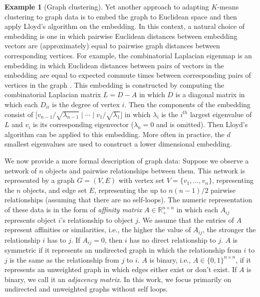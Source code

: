 \documentclass[
  12pt,
]{article}
\theoremstyle{definition}
\theoremstyle{definition}
\newtheorem{example}{Example}[section]
\theoremstyle{definition}
\theoremstyle{definition}
\theoremstyle{remark}
\begin{document}
\begin{example}[Graph clustering]
Yet another approach to adapting $K$-means clustering to graph data is to embed the graph to Euclidean space and then apply Lloyd's algorithm on the embedding. 
In this context, a natural choice of embedding is one in which pairwise Euclidean distances between embedding vectors are (approximately) equal to pairwise graph distances between corresponding vertices. 
For example, the combinatorial Laplacian eigenmap is an embedding in which Euclidean distances between pairs of vectors in the embedding are equal to expected commute times between corresponding pairs of vertices in the graph \citep{vonLuxburg2007}. 
This embedding is constructed by computing the combinatorial Laplacian matrix $L = D - A$ in which $D$ is a diagonal matrix in which each $D_{ii}$ is the degree of vertex $i$. 
Then the components of the embedding consist of $\big[ v_{n-1} / \sqrt{\lambda_{n - 1}} \mid \cdots \mid v_1 / \sqrt{\lambda_1} \big]$ in which $\lambda_i$ is the $i^{th}$ largest eigenvalue of $L$ and $v_i$ is its corresponding eigenvector ($\lambda_n = 0$ and is omitted). 
Then Lloyd's algorithm can be applied to this embedding. 
More often in practice, the $d$ smallest eigenvalues are used to construct a lower dimensional embedding. 
\end{example}

We now provide a more formal description of graph data:
Suppose we observe a network of \(n\) objects and pairwise relationships between them.
This network is represented by a graph \(G = (V, E)\) with vertex set \(V = \{v_1, ..., v_n\}\), representing the \(n\) objects, and edge set \(E\), representing the up to \(n (n - 1) / 2\) pairwise relationships (assuming that there are no self-loops).
The numeric representation of these data is in the form of \emph{affinity matrix} \(A \in \mathbb{R}_+^{n \times n}\) in which each \(A_{ij}\) represents object \(i\)'s relationship to object \(j\).
We assume that the entries of \(A\) represent affinities or similarities, i.e., the higher the value of \(A_{ij}\), the stronger the relationship \(i\) has to \(j\).
If \(A_{ij} = 0\), then \(i\) has no direct relationship to \(j\).
\(A\) is symmetric if it represents an undirected graph in which the relationship from \(i\) to \(j\) is the same as the relationship from \(j\) to \(i\).
\(A\) is binary, i.e., \(A \in \{0, 1\}^{n \times n}\), if it represents an unweighted graph in which edges either exist or don't exist.
If \(A\) is binary, we call it an \emph{adjacency matrix}.
In this work, we focus primarily on undirected and unweighted graphs without self loops.
\end{document}
